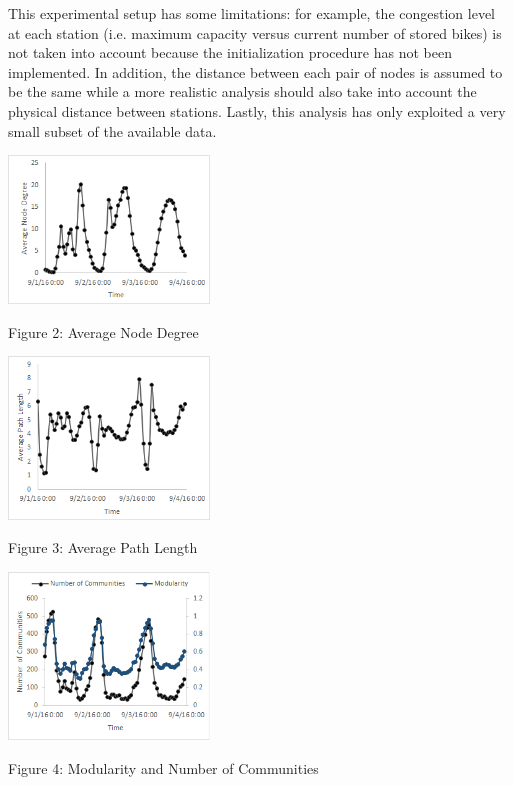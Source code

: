 \documentclass[times, 10pt,twocolumn]{article}
\begin{document}
This experimental setup has some limitations: for example, the congestion level at each station (i.e. maximum capacity versus current number of stored bikes) is not taken into account because the initialization procedure has not been implemented. In addition, the distance between each pair of nodes is assumed to be the same while a more realistic analysis should also take into account the physical distance between stations. Lastly, this analysis has only exploited a very small subset of the available data.

\centerline{\includegraphics[width=0.4\textwidth]{node_degree.jpg}}
\centerline{Figure 2: Average Node Degree}
\vspace{5mm}

\centerline{\includegraphics[width=0.4\textwidth]{path_length.jpg}}
\centerline{Figure 3: Average Path Length}
\vspace{5mm}

\centerline{\includegraphics[width=0.4\textwidth]{communities.jpg}}
\centerline{Figure 4: Modularity and Number of Communities}
\end{document}
